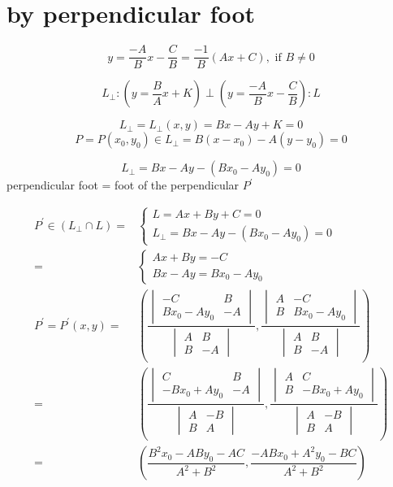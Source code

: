 \documentclass[
]{book}
\theoremstyle{definition}
\theoremstyle{definition}
\theoremstyle{definition}
\theoremstyle{definition}
\theoremstyle{remark}
\begin{document}
\hypertarget{by-perpendicular-foot}{%
\section{by perpendicular foot}\label{by-perpendicular-foot}}

\[
y=\dfrac{-A}{B}x-\dfrac{C}{B}=\dfrac{-1}{B}\left(Ax+C\right),\text{ if }B\ne0
\]

\[
L_{\perp}:\left(y=\dfrac{B}{A}x+K\right)\perp\left(y=\dfrac{-A}{B}x-\dfrac{C}{B}\right):L
\]

\[
L_{\perp}=L_{\perp}\left(x,y\right)=Bx-Ay+K=0
\]
\[
P=P\left(x_{0},y_{0}\right)\in L_{\perp}=B\left(x-x_{0}\right)-A\left(y-y_{0}\right)=0
\]

\[
L_{\perp}=Bx-Ay-\left(Bx_{0}-Ay_{0}\right)=0
\]
perpendicular foot = foot of the perpendicular \(P^{\prime}\)

\[
\begin{aligned}
P^{\prime}\in\left(L_{\perp}\cap L\right)= & \begin{cases}
L=Ax+By+C=0\\
L_{\perp}=Bx-Ay-\left(Bx_{0}-Ay_{0}\right)=0
\end{cases}\\
= & \begin{cases}
Ax+By=-C\\
Bx-Ay=Bx_{0}-Ay_{0}
\end{cases}\\
P^{\prime}=P^{\prime}\left(x,y\right)= & \left(\dfrac{\begin{vmatrix}-C & B\\
Bx_{0}-Ay_{0} & -A
\end{vmatrix}}{\begin{vmatrix}A & B\\
B & -A
\end{vmatrix}},\dfrac{\begin{vmatrix}A & -C\\
B & Bx_{0}-Ay_{0}
\end{vmatrix}}{\begin{vmatrix}A & B\\
B & -A
\end{vmatrix}}\right)\\
= & \left(\dfrac{\begin{vmatrix}C & B\\
-Bx_{0}+Ay_{0} & -A
\end{vmatrix}}{\begin{vmatrix}A & -B\\
B & A
\end{vmatrix}},\dfrac{\begin{vmatrix}A & C\\
B & -Bx_{0}+Ay_{0}
\end{vmatrix}}{\begin{vmatrix}A & -B\\
B & A
\end{vmatrix}}\right)\\
= & \left(\dfrac{B^{2}x_{0}-ABy_{0}-AC}{A^{2}+B^{2}},\dfrac{-ABx_{0}+A^{2}y_{0}-BC}{A^{2}+B^{2}}\right)
\end{aligned}
\]
\end{document}
